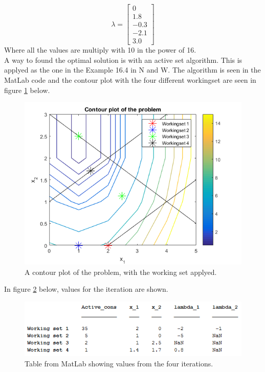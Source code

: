 \[\lambda=\begin{bmatrix}
	0 \\1.8 \\-0.3 \\-2.1 \\ 3.0
\end{bmatrix}\]
Where all the values are multiply with 10 in the power of 16. 
\\A way to found the optimal solution is with an active set algorithm. This is applyed as the one in the Example 16.4 in N and W. The algorithm is seen in the MatLab code and the contour plot with the four different workingset are seen in figure \ref{fig:exe3_contour_plot_workingset} below. 
\begin{figure}[H]
	\centering
		\includegraphics[scale=0.65]{exe3_contour_plot_workingset.png} 
	\caption{A contour plot of the problem, with the working set applyed.}
	\label{fig:exe3_contour_plot_workingset}
\end{figure} 
In figure \ref{fig:exe3_table_part5} below, values for the iteration are shown. 
\begin{figure}[H]
	\centering
	\includegraphics[scale=1]{exe3_table_part5.png} 
	\caption{Table from MatLab showing values from the four iterations.}
	\label{fig:exe3_table_part5}
\end{figure}
